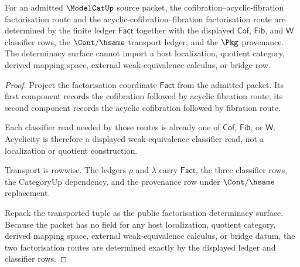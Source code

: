 \begin{theorem}
\label{thm:modelcat-factorization-ledger-determinacy}
For an admitted $\ModelCatUp$ source packet, the cofibration--acyclic-fibration
factorisation route and the acyclic-cofibration--fibration factorisation route
are determined by the finite ledger $\mathsf{Fact}$ together with the displayed
$\mathsf{Cof}$, $\mathsf{Fib}$, and $\mathsf{W}$ classifier rows, the
$\Cont/\hsame$ transport ledger, and the $\Pkg$ provenance. The determinacy
surface cannot import a host localization, quotient category, derived mapping
space, external weak-equivalence calculus, or bridge row.
\end{theorem}
\begin{proof}
Project the factorisation coordinate $\mathsf{Fact}$ from the admitted packet.
Its first component records the cofibration followed by acyclic fibration
route; its second component records the acyclic cofibration followed by
fibration route.

Each classifier read needed by those routes is already one of
$\mathsf{Cof}$, $\mathsf{Fib}$, or $\mathsf{W}$. Acyclicity is therefore a
displayed weak-equivalence classifier read, not a localization or quotient
construction.

Transport is rowwise. The ledgers $\rho$ and $\lambda$ carry $\mathsf{Fact}$,
the three classifier rows, the CategoryUp dependency, and the provenance row
under $\Cont/\hsame$ replacement.

Repack the transported tuple as the public factorisation determinacy surface.
Because the packet has no field for any host localization, quotient category,
derived mapping space, external weak-equivalence calculus, or bridge datum, the
two factorisation routes are determined exactly by the displayed ledger and
classifier rows.
\end{proof}

